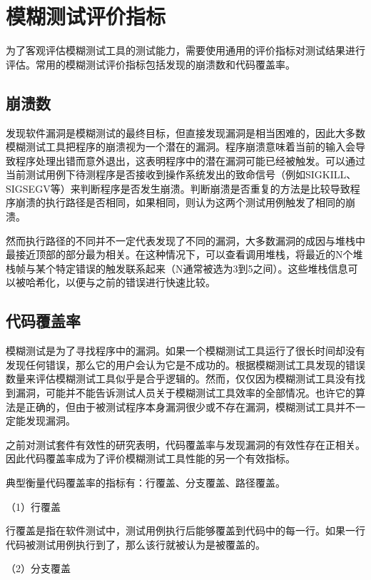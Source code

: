\documentclass[master]{thesis-uestc}
\begin{document}
\section{模糊测试评价指标}
为了客观评估模糊测试工具的测试能力，需要使用通用的评价指标对测试结果进行评估。常用的模糊测试评价指标包括发现的崩溃数和代码覆盖率。

\subsection{崩溃数}

发现软件漏洞是模糊测试的最终目标，但直接发现漏洞是相当困难的，因此大多数模糊测试工具把程序的崩溃视为一个潜在的漏洞。程序崩溃意味着当前的输入会导致程序处理出错而意外退出，这表明程序中的潜在漏洞可能已经被触发。可以通过当前测试用例下待测程序是否接收到操作系统发出的致命信号（例如SIGKILL、SIGSEGV等）来判断程序是否发生崩溃。判断崩溃是否重复的方法是比较导致程序崩溃的执行路径是否相同，如果相同，则认为这两个测试用例触发了相同的崩溃。

然而执行路径的不同并不一定代表发现了不同的漏洞，大多数漏洞的成因与堆栈中最接近顶部的部分最为相关。在这种情况下，可以查看调用堆栈，将最近的N个堆栈帧与某个特定错误的触发联系起来（N通常被选为3到5之间）。这些堆栈信息可以被哈希化，以便与之前的错误进行快速比较。


\subsection{代码覆盖率}

模糊测试是为了寻找程序中的漏洞。如果一个模糊测试工具运行了很长时间却没有发现任何错误，那么它的用户会认为它是不成功的。根据模糊测试工具发现的错误数量来评估模糊测试工具似乎是合乎逻辑的。然而，仅仅因为模糊测试工具没有找到漏洞，可能并不能告诉测试人员关于模糊测试工具效率的全部情况。也许它的算法是正确的，但由于被测试程序本身漏洞很少或不存在漏洞，模糊测试工具并不一定能发现漏洞。

之前对测试套件有效性的研究表明，代码覆盖率与发现漏洞的有效性存在正相关。因此代码覆盖率成为了评价模糊测试工具性能的另一个有效指标。

典型衡量代码覆盖率的指标有：行覆盖、分支覆盖、路径覆盖。

（1）行覆盖

行覆盖是指在软件测试中，测试用例执行后能够覆盖到代码中的每一行。如果一行代码被测试用例执行到了，那么该行就被认为是被覆盖的。

（2）分支覆盖
\end{document}
